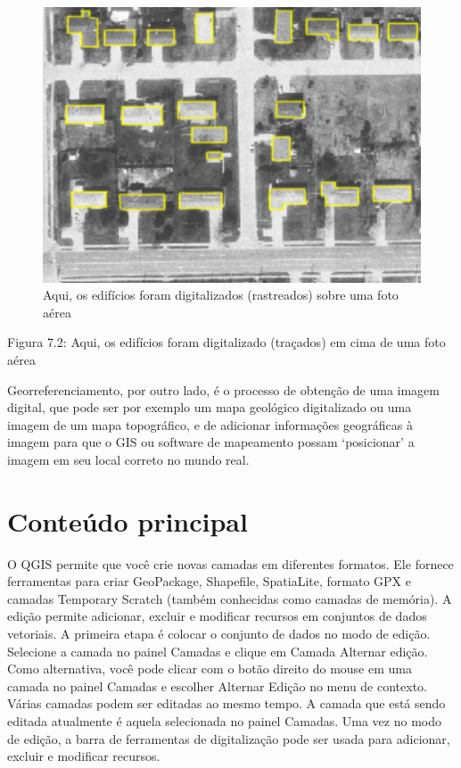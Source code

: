 \documentclass[
]{book}
\begin{document}
\begin{figure}
\centering
\includegraphics{media/modulo7/buildings.png}
\caption{Aqui, os edifícios foram digitalizados (rastreados) sobre uma foto aérea}
\end{figure}

Figura 7.2: Aqui, os edifícios foram digitalizado (traçados) em cima de uma foto aérea

Georreferenciamento, por outro lado, é o processo de obtenção de uma imagem digital, que pode ser por exemplo um mapa geológico digitalizado ou uma imagem de um mapa topográfico, e de adicionar informações geográficas à imagem para que o GIS ou software de mapeamento possam `posicionar' a imagem em seu local correto no mundo real.

\hypertarget{conteuxfado-principal-6}{%
\section{Conteúdo principal}\label{conteuxfado-principal-6}}

O QGIS permite que você crie novas camadas em diferentes formatos. Ele fornece ferramentas para criar GeoPackage, Shapefile, SpatiaLite, formato GPX e camadas Temporary Scratch (também conhecidas como camadas de memória). A edição permite adicionar, excluir e modificar recursos em conjuntos de dados vetoriais. A primeira etapa é colocar o conjunto de dados no modo de edição. Selecione a camada no painel Camadas e clique em Camada \textbar{} Alternar edição. Como alternativa, você pode clicar com o botão direito do mouse em uma camada no painel Camadas e escolher Alternar Edição no menu de contexto. Várias camadas podem ser editadas ao mesmo tempo. A camada que está sendo editada atualmente é aquela selecionada no painel Camadas. Uma vez no modo de edição, a barra de ferramentas de digitalização pode ser usada para adicionar, excluir e modificar recursos.
\end{document}
